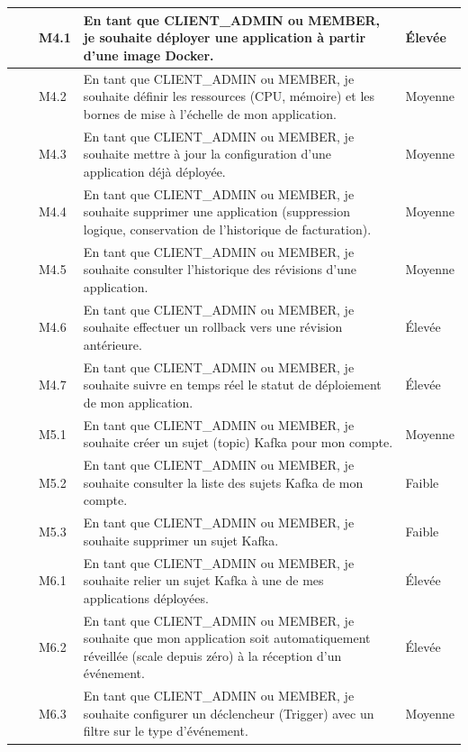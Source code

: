 {\begin{longtable}{|>{\centering\arraybackslash}m{1.1cm}|>{\centering\arraybackslash}m{2.9cm}|>{\centering\arraybackslash}m{1.4cm}|>{\raggedright\arraybackslash}p{6.6cm}|>{\centering\arraybackslash}m{2.3cm}|}
\multirow{1}{*}{M4} & \multirow{1}{2.9cm}{\centering Gestion des applications} & M4.1 & En tant que CLIENT\_ADMIN ou MEMBER, je souhaite déployer une application à partir d'une image Docker. & Élevée\\
\cline{3-5}
&& M4.2 & En tant que CLIENT\_ADMIN ou MEMBER, je souhaite définir les ressources (CPU, mémoire) et les bornes de mise à l'échelle de mon application. & Moyenne\\
\cline{3-5}
&& M4.3 & En tant que CLIENT\_ADMIN ou MEMBER, je souhaite mettre à jour la configuration d'une application déjà déployée. & Moyenne\\
\cline{3-5}
&& M4.4 & En tant que CLIENT\_ADMIN ou MEMBER, je souhaite supprimer une application (suppression logique, conservation de l'historique de facturation). & Moyenne\\
\cline{3-5}
&& M4.5 & En tant que CLIENT\_ADMIN ou MEMBER, je souhaite consulter l'historique des révisions d'une application. & Moyenne\\
\cline{3-5}
&& M4.6 & En tant que CLIENT\_ADMIN ou MEMBER, je souhaite effectuer un rollback vers une révision antérieure. & Élevée\\
\cline{3-5}
&& M4.7 & En tant que CLIENT\_ADMIN ou MEMBER, je souhaite suivre en temps réel le statut de déploiement de mon application. & Élevée\\
\hline

\multirow{3}{*}{M5} & \multirow{3}{2.9cm}{\centering Messaging Kafka} & M5.1 & En tant que CLIENT\_ADMIN ou MEMBER, je souhaite créer un sujet (topic) Kafka pour mon compte. & Moyenne\\
\cline{3-5}
&& M5.2 & En tant que CLIENT\_ADMIN ou MEMBER, je souhaite consulter la liste des sujets Kafka de mon compte. & Faible\\
\cline{3-5}
&& M5.3 & En tant que CLIENT\_ADMIN ou MEMBER, je souhaite supprimer un sujet Kafka. & Faible\\
\hline

\multirow{3}{*}{M6} & \multirow{3}{2.9cm}{\centering Knative Eventing} & M6.1 & En tant que CLIENT\_ADMIN ou MEMBER, je souhaite relier un sujet Kafka à une de mes applications déployées. & Élevée\\
\cline{3-5}
&& M6.2 & En tant que CLIENT\_ADMIN ou MEMBER, je souhaite que mon application soit automatiquement réveillée (scale depuis zéro) à la réception d'un événement. & Élevée\\
\cline{3-5}
&& M6.3 & En tant que CLIENT\_ADMIN ou MEMBER, je souhaite configurer un déclencheur (Trigger) avec un filtre sur le type d'événement. & Moyenne\\
\hline


\end{longtable}}
